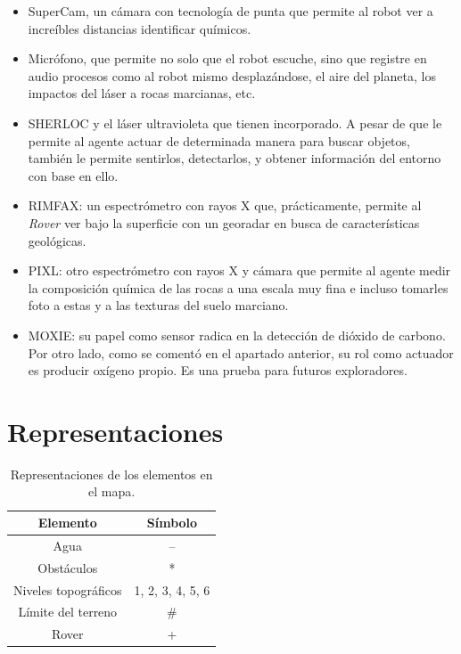 \documentclass[12pt, letterpaper]{article}
\begin{document}
        \begin{itemize}

            \item SuperCam\cite{maurice2021supercam}, un cámara con tecnología de punta que permite al robot ver a increíbles distancias identificar químicos.
            \item Micrófono, que permite no solo que el robot escuche, sino que registre en audio procesos como al robot mismo desplazándose, el aire del planeta, los impactos del láser a rocas marcianas, etc.\cite{leighton2021thoughts}
            \item SHERLOC\cite{beegle2016sherloc} y el láser ultravioleta que tienen incorporado. A pesar de que le permite al agente actuar de determinada manera para buscar objetos, también le permite sentirlos, detectarlos, y obtener información del entorno con base en ello.
            \item RIMFAX\cite{hamran2015rimfax}: un espectrómetro con rayos X que, prácticamente, permite al \textit{Rover} ver bajo la superficie con un georadar en busca de características geológicas.
            \item PIXL\cite{allwood2021pixl}: otro espectrómetro con rayos X y cámara que permite al agente medir la composición química de las rocas a una escala muy fina e incluso tomarles foto a estas y a las texturas del suelo marciano.
            \item MOXIE:\cite{hoffman2022mars} su papel como sensor radica en la detección de dióxido de carbono. Por otro lado, como se comentó en el apartado anterior, su rol como actuador es producir oxígeno propio. Es una prueba para futuros exploradores.
        \end{itemize}

\section{Representaciones}

    \begin{table}[h!]
        \centering
        \begin{tabular}{|c|c|} %
            \hline %
            \textbf{Elemento} & \textbf{Símbolo} \\
            \hline %
            Agua & --\\
            \hline %
            Obstáculos & * \\
            \hline %
            Niveles topográficos & 1, 2, 3, 4, 5, 6 \\
            \hline %
            Límite del terreno & \# \\
            \hline %
            Rover & + \\
            \hline %
        \end{tabular}
        \caption{Representaciones de los elementos en el mapa.}\label{tabla:representaciones}
    \end{table}
\end{document}
